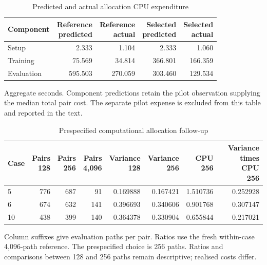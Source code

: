\documentclass[11pt]{article}
\begin{document}
\begin{table}[htbp]
\centering\small
\caption{Predicted and actual allocation CPU expenditure}\label{tab:allocation-costs}
\setlength{\tabcolsep}{4pt}
\begin{tabular}{lrrrr}
\toprule
Component & \shortstack{Reference\\predicted} & \shortstack{Reference\\actual} & \shortstack{Selected\\predicted} & \shortstack{Selected\\actual} \\
\midrule
Setup & 2.333 & 1.104 & 2.333 & 1.060 \\
Training & 75.569 & 34.814 & 366.801 & 166.359 \\
Evaluation & 595.503 & 270.059 & 303.460 & 129.534 \\
\bottomrule
\end{tabular}
\par\smallskip\begin{minipage}{\textwidth}\footnotesize Aggregate seconds. Component predictions retain the pilot observation supplying the median total pair cost. The separate pilot expense is excluded from this table and reported in the text.\end{minipage}
\end{table}

\begin{table}[htbp]
\centering\small
\caption{Prespecified computational allocation follow-up}\label{tab:prospective-allocation}
\setlength{\tabcolsep}{4pt}
\begin{tabular}{lrrrrrrr}
\toprule
Case & \shortstack{Pairs\\128} & \shortstack{Pairs\\256} & \shortstack{Pairs\\4,096} & \shortstack{Variance\\128} & \shortstack{Variance\\256} & \shortstack{CPU\\256} & \shortstack{Variance\\times CPU\\256} \\
\midrule
5 & 776 & 687 & 91 & 0.169888 & 0.167421 & 1.510736 & 0.252928 \\
6 & 674 & 632 & 141 & 0.396693 & 0.340606 & 0.901768 & 0.307147 \\
10 & 438 & 399 & 140 & 0.364378 & 0.330904 & 0.655844 & 0.217021 \\
\bottomrule
\end{tabular}
\par\smallskip\begin{minipage}{\textwidth}\footnotesize Column suffixes give evaluation paths per pair. Ratios use the fresh within-case 4,096-path reference. The prespecified choice is 256 paths. Ratios and comparisons between 128 and 256 paths remain descriptive; realised costs differ.\end{minipage}
\end{table}
\end{document}
